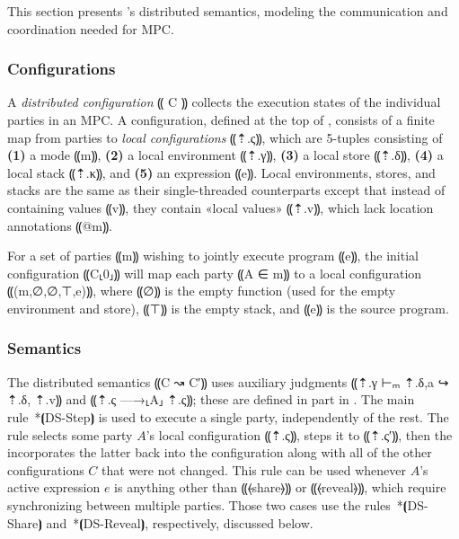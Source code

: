 This section presents \mpc's distributed semantics, modeling the
communication and coordination needed for MPC.

\subsubsection{Configurations}
\label{subsubsec:mpc-design-dist-config}


A \emph{distributed configuration} ⸨ C ⸩ collects the execution states
of the individual parties in an MPC\@. A configuration, defined at the top of
, consists of a finite map from parties to \emph{local configurations} ⸨⇡.ς⸩,
which are 5-tuples consisting of %
\textbf{(1)} a mode ⸨m⸩, %
\textbf{(2)} a local environment ⸨⇡.γ⸩, %
\textbf{(3)} a local store ⸨⇡.δ⸩, %
\textbf{(4)} a local stack ⸨⇡.κ⸩, and %
\textbf{(5)} an expression ⸨e⸩.
Local environments, stores, and stacks are the same as their
single-threaded counterparts except that instead of containing
values ⸨v⸩, they contain «local values» ⸨⇡.v⸩, which lack location
annotations ⸨@m⸩.

For a set of parties ⸨m⸩ wishing to jointly execute program ⸨e⸩, the
initial configuration ⸨C⸤0⸥⸩ will map each party ⸨A ∈ m⸩ to a local
configuration ⸨(m,∅,∅,⊤,e)⸩, where ⸨∅⸩ is the empty function (used for
the empty environment and store), ⸨⊤⸩ is the empty stack, and ⸨e⸩ is
the source program.

\subsubsection{Semantics}
\label{subsubsec:mpc-design-dist-sem}

The distributed semantics ⸨C ↝ C′⸩ uses auxiliary judgments ⸨⇡.γ ⊢ₘ ⇡.δ,a ↪
⇡.δ, ⇡.v⸩ and ⸨⇡.ς —→⸤A⸥ ⇡.ς⸩; these are defined in part in
. The main rule~*⦗DS-Step⦘ is used to execute a single party,
independently of the rest. The rule selects some party $A$'s local
configuration ⸨⇡.ς⸩, steps it to ⸨⇡.ς′⸩, then the incorporates the
latter back into the configuration along with all of the other
configurations $C$ that were not changed. This rule can be used
whenever $A$'s active expression $e$ is anything other than ⸨⦑share⦒⸩ or
⸨⦑reveal⦒⸩, which require synchronizing between multiple parties.
Those two cases use the rules~*⦗DS-Share⦘ and~*⦗DS-Reveal⦘,
respectively, discussed below.

